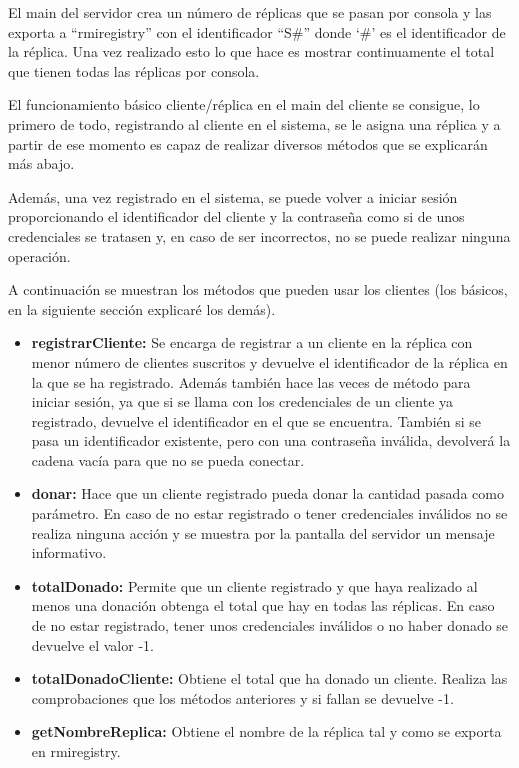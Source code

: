 \documentclass{article}
\begin{document}


El main del servidor crea un número de réplicas que se pasan por consola y las exporta a ``rmiregistry'' con el identificador ``S\#'' donde `\#' es el identificador de la réplica. Una vez realizado esto lo que hace es mostrar continuamente el total que tienen todas las réplicas por consola.

El funcionamiento básico cliente/réplica en el main del cliente se consigue, lo primero de todo, registrando al cliente en el sistema, se le asigna una réplica y a partir de ese momento es capaz de realizar diversos métodos que se explicarán más abajo.

Además, una vez registrado en el sistema, se puede volver a iniciar sesión proporcionando el identificador del cliente y la contraseña como si de unos credenciales se tratasen y, en caso de ser incorrectos, no se puede realizar ninguna operación.

A continuación se muestran los métodos que pueden usar los clientes (los básicos, en la siguiente sección explicaré los demás).

\begin{itemize}
    \item \textbf{registrarCliente: }Se encarga de registrar a un cliente en la réplica con menor número de clientes suscritos y devuelve el identificador de la réplica en la que se ha registrado. Además también hace las veces de método para iniciar sesión, ya que si se llama con los credenciales de un cliente ya registrado, devuelve el identificador en el que se encuentra. También si se pasa un identificador existente, pero con una contraseña inválida, devolverá la cadena vacía para que no se pueda conectar.
    
    \item \textbf{donar: }Hace que un cliente registrado pueda donar la cantidad pasada como parámetro. En caso de no estar registrado o tener credenciales inválidos no se realiza ninguna acción y se muestra por la pantalla del servidor un mensaje informativo.

    \item \textbf{totalDonado: }Permite que un cliente registrado y que haya realizado al menos una donación obtenga el total que hay en todas las réplicas. En caso de no estar registrado, tener unos credenciales inválidos o no haber donado se devuelve el valor -1.
    
    \item \textbf{totalDonadoCliente: }Obtiene el total que ha donado un cliente. Realiza las comprobaciones que los métodos anteriores y si fallan se devuelve -1.\
    
    \item \textbf{getNombreReplica: }Obtiene el nombre de la réplica tal y como se exporta en rmiregistry.
\end{itemize}
\end{document}
